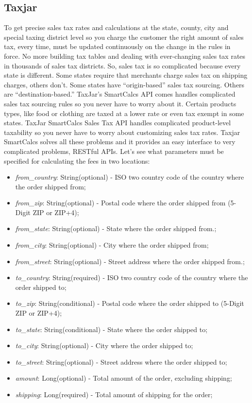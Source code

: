 \subsection{Taxjar}
To get precise sales tax rates and calculations at the state, county, city and special taxing district level so you charge the customer the right amount of sales tax, every time, must be updated continuously on the change in the rules in force.
\newline
No more building tax tables and dealing with ever-changing sales tax rates in thousands of sales tax districts.
So, sales tax is so complicated because every state is different. Some states require that merchants charge sales tax on shipping charges, others don’t.
\newline
Some states have “origin-based” sales tax sourcing. Others are “destination-based.” TaxJar’s SmartCalcs API comes handles complicated sales tax sourcing rules so you never have to worry about it.
Certain products types, like food or clothing are taxed at a lower rate or even tax exempt in some states. TaxJar SmartCalcs Sales Tax API handles complicated product-level taxability so you never have to worry about customizing sales tax rates.
\newline
Taxjar SmartCalcs solves all these problems and it provides an easy interface to very complicated problems, RESTful APIs.
\newline
Let's see what parameters must be specified for calculating the fees in two locations:
\begin{itemize}
  \item \emph{from\_country}: String(optional) - ISO two country code of the country where the order shipped from;
  \item \emph{from\_zip}: String(optional) - Postal code where the order shipped from (5-Digit ZIP or ZIP+4);
  \item \emph{from\_state}: String(optional) - State where the order shipped from.;
  \item \emph{from\_city}: String(optional) - City where the order shipped from;
  \item \emph{from\_street}: String(optional) - Street address where the order shipped from.;
  \item \emph{to\_country}: String(required) - ISO two country code of the country where the order shipped to;
  \item \emph{to\_zip}: String(conditional) - Postal code where the order shipped to (5-Digit ZIP or ZIP+4);
  \item \emph{to\_state}: String(conditional) - State where the order shipped to;
  \item \emph{to\_city}: String(optional) - City where the order shipped to;
  \item \emph{to\_street}: String(optional) - Street address where the order shipped to;
  \item \emph{amount}: Long(optional) - Total amount of the order, excluding shipping;
  \item \emph{shipping}: Long(required) - Total amount of shipping for the order;
\end{itemize}
